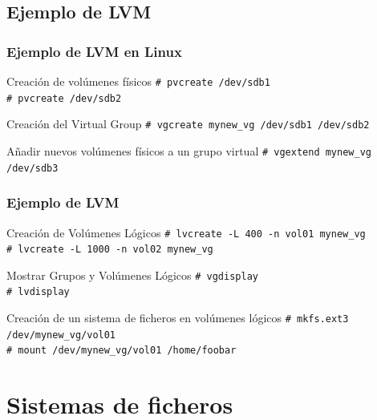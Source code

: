 \documentclass{beamer}
\begin{document}
\subsection{Ejemplo de LVM}
\begin{frame}
  \frametitle{Ejemplo de LVM en Linux}

\begin{block}{Creación de volúmenes físicos}
  \texttt{\# pvcreate /dev/sdb1} \\
  \texttt{\# pvcreate /dev/sdb2}
\end{block}

\begin{block}{Creación del Virtual Group}
  \texttt{\# vgcreate mynew\_vg /dev/sdb1 /dev/sdb2 }
\end{block}

\begin{block}{Añadir nuevos volúmenes físicos a un grupo virtual}
  \texttt{\# vgextend mynew\_vg /dev/sdb3 } 
\end{block}

\end{frame}


\begin{frame}
  \frametitle{Ejemplo de LVM}

\begin{block}{Creación de Volúmenes Lógicos}
  \texttt{\# lvcreate -L 400 -n vol01 mynew\_vg } \\
  \texttt{\# lvcreate -L 1000 -n vol02 mynew\_vg }
\end{block}

\begin{block}{Mostrar Grupos y Volúmenes Lógicos}
  \texttt{\# vgdisplay } \\
  \texttt{\# lvdisplay }
\end{block}

\begin{block}{Creación de un sistema de ficheros en volúmenes lógicos}
  \texttt{\# mkfs.ext3 /dev/mynew\_vg/vol01} \\
  \texttt{\# mount /dev/mynew\_vg/vol01 /home/foobar}
\end{block}
\end{frame}


\section{Sistemas de ficheros}
\end{document}
